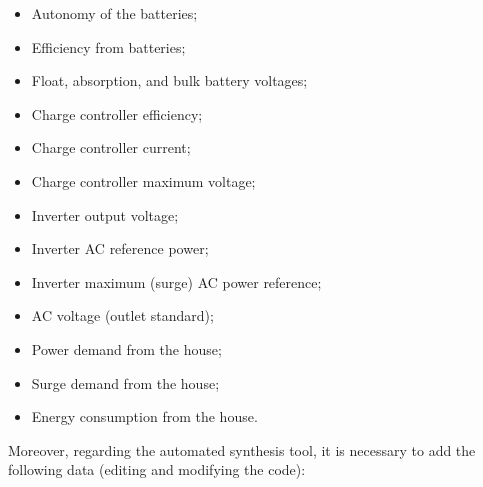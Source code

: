 \begin{itemize}
\item Autonomy of the batteries;
\item Efficiency from batteries;
\item Float, absorption, and bulk battery voltages;
\item Charge controller efficiency;
\item Charge controller current;
\item Charge controller maximum voltage;
\item Inverter output voltage;
\item Inverter AC reference power;
\item Inverter maximum (surge) AC power reference;
\item AC voltage (outlet standard);
\item Power demand from the house;
\item Surge demand from the house;
\item Energy consumption from the house.
\end{itemize}

Moreover, regarding the automated synthesis tool, it is necessary to add the following data (editing and modifying the code):

